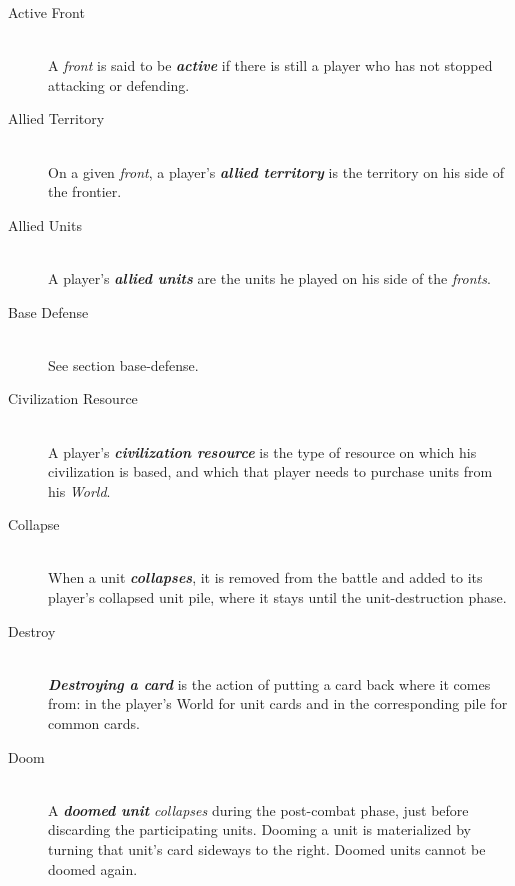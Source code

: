 \documentclass[a4paper]{article}
\begin{document}
    \begin{description}
        \item[Active Front] \hfill \\
            A \textit{front} is said to be \textbf{\textit{active}} if there is still a player
            who has not stopped attacking or defending.
            
        \item[Allied Territory] \hfill \\
            On a given \textit{front}, a player's \textbf{\textit{allied territory}}
            is the territory on his side of the frontier.
            
        \item[Allied Units] \hfill \\
            A player's \textbf{\textit{allied units}} are the units he played on his side
            of the \textit{fronts}.
            
        \item[Base Defense] \hfill \\
            See section {base-defense}.
            
        \item[Civilization Resource] \hfill \\
            A player's \textbf{\textit{civilization resource}} is the type of resource
            on which his civilization is based, and which that player needs to purchase
            units from his \textit{World}.
            
        \item[Collapse] \hfill \\
            When a unit \textbf{\textit{collapses}},
            it is removed from the battle and added to its player's collapsed unit pile,
            where it stays until the unit-destruction phase.
            
        \item[Destroy] \hfill \\
            \textbf{\textit{Destroying a card}} is the action of putting a card back
            where it comes from: in the player's World for unit cards and
            in the corresponding pile for common cards.
            
        \item[Doom] \hfill \\
            A \textbf{\textit{doomed unit}} \textit{collapses} during the post-combat
            phase, just before discarding the participating units.
            Dooming a unit is materialized by turning that unit's card
            sideways to the right.
            Doomed units cannot be doomed again.
            

\end{description}
\end{document}
